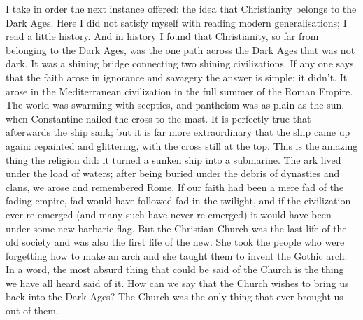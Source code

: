 I take in order the next instance offered: the idea that Christianity belongs to the Dark Ages. Here I did not satisfy myself with reading modern generalisations; I read a little history. And in history I found that Christianity, so far from belonging to the Dark Ages, was the one path across the Dark Ages that was not dark. It was a shining bridge connecting two shining civilizations. If any one says that the faith arose in ignorance and savagery the answer is simple: it didn’t. It arose in the Mediterranean civilization in the full summer of the Roman Empire. The world was swarming with sceptics, and pantheism was as plain as the sun, when Constantine nailed the cross to the mast. It is perfectly true that afterwards the ship sank; but it is far more extraordinary that the ship came up again: repainted and glittering, with the cross still at the top. This is the amazing thing the religion did: it turned a sunken ship into a submarine. The ark lived under the load of waters; after being buried under the debris of dynasties and clans, we arose and remembered Rome. If our faith had been a mere fad of the fading empire, fad would have followed fad in the twilight, and if the civilization ever re-emerged (and many such have never re-emerged) it would have been under some new barbaric flag. But the Christian Church was the last life of the old society and was also the first life of the new. She took the people who were forgetting how to make an arch and she taught them to invent the Gothic arch. In a word, the most absurd thing that could be said of the Church is the thing we have all heard said of it. How can we say that the Church wishes to bring us back into the Dark Ages? The Church was the only thing that ever brought us out of them.

